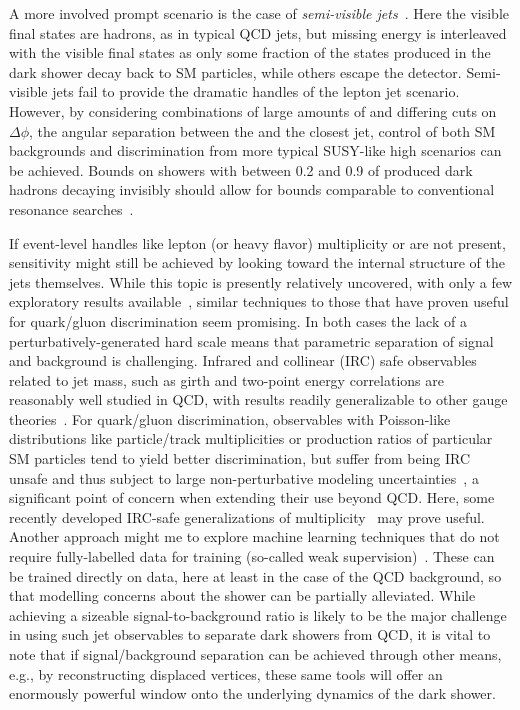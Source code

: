 A more involved prompt scenario is the case of  \emph{semi-visible jets}~\cite{Cohen:2015toa}.  Here the visible final states are hadrons, as in typical QCD jets, but missing energy is interleaved with the visible final states as only some fraction of the states produced in the dark shower decay back to SM particles, while others escape the detector. Semi-visible jets fail to provide the dramatic handles of the lepton jet scenario. However, by considering combinations of large amounts of \MET and differing cuts on $\Delta\phi$, the angular separation between the \MET and the closest jet, control of both SM backgrounds and discrimination from more typical SUSY-like high \MET scenarios can be achieved. Bounds on showers with between 0.2 and 0.9 of produced dark hadrons decaying invisibly should allow for bounds comparable to conventional resonance searches~\cite{Cohen:2017pzm}.

If event-level handles like lepton (or heavy flavor) multiplicity or \MET are not present, sensitivity might still be achieved by looking toward the internal structure of the jets themselves. While this topic is presently relatively uncovered, with only a few exploratory results available~\cite{Park:2017rfb}, similar techniques to those that have proven useful for quark/gluon discrimination seem promising. In both cases the lack of a perturbatively-generated hard scale means that parametric separation of signal and background is challenging. Infrared and collinear (IRC) safe observables related to jet mass, such as girth and two-point energy correlations are reasonably well studied in QCD, with results readily generalizable to other gauge theories~\cite{Gallicchio:2010dq,Larkoski:2013eya,Larkoski:2014gra}. For quark/gluon discrimination, observables with Poisson-like distributions like particle/track multiplicities or production ratios of particular SM particles tend to yield better discrimination, but suffer from being IRC unsafe and thus subject to large non-perturbative modeling uncertainties~\cite{Gras:2017jty}, a significant point of concern when extending their use beyond QCD. Here, some recently developed IRC-safe generalizations of multiplicity~\cite{Frye:2017yrw} may prove useful.  Another approach might me to explore machine learning techniques that do not require fully-labelled data for training (so-called weak supervision)~\cite{Dery:2017fap,Cohen:2017exh,Metodiev:2017vrx}.  These can be trained directly on data, here at least in the case of the QCD background, so that modelling concerns about the shower can be partially alleviated.  While achieving a sizeable signal-to-background ratio is likely to be the major challenge in using such jet observables to separate dark showers from QCD, it is vital to note that if signal/background separation can be achieved through other means, e.g., by reconstructing displaced vertices, these same tools will offer an enormously powerful window onto the underlying dynamics of the dark shower. 



